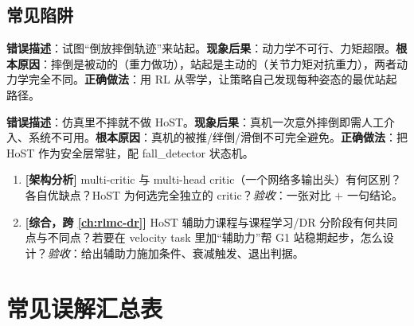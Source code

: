 \subsection{常见陷阱}
\begin{pitfall}[以为站起来是摔倒的逆过程]
\textbf{错误描述}：试图“倒放摔倒轨迹”来站起。\textbf{现象后果}：动力学不可行、力矩超限。\textbf{根本原因}：摔倒是被动的（重力做功），站起是主动的（关节力矩对抗重力），两者动力学完全不同。\textbf{正确做法}：用 RL 从零学，让策略自己发现每种姿态的最优站起路径。
\end{pitfall}

\begin{pitfall}
\textbf{错误描述}：仿真里不摔就不做 HoST。\textbf{现象后果}：真机一次意外摔倒即需人工介入、系统不可用。\textbf{根本原因}：真机的被推/绊倒/滑倒不可完全避免。\textbf{正确做法}：把 HoST 作为安全层常驻，配 fall\_detector 状态机。
\end{pitfall}

\begin{practice}[本节动手]
\begin{enumerate}
  \item \textbf{[架构分析]} multi-critic 与 multi-head critic（一个网络多输出头）有何区别？各自优缺点？HoST 为何选完全独立的 critic？\emph{验收}：一张对比 $+$ 一句结论。
  \item \textbf{[综合，跨 \cref{ch:rlmc-dr}]} HoST 辅助力课程与课程学习/DR 分阶段有何共同点与不同点？若要在 velocity task 里加“辅助力”帮 G1 站稳期起步，怎么设计？\emph{验收}：给出辅助力施加条件、衰减触发、退出判据。
\end{enumerate}
\end{practice}

\section*{常见误解汇总表}


